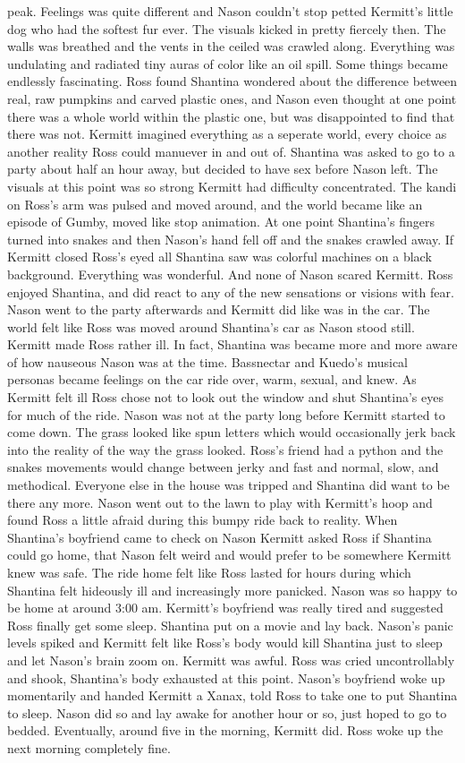 \documentclass[12pt]{book}
\begin{document}
peak. Feelings was quite different and Nason couldn't stop petted Kermitt's little dog who had the softest fur ever. The visuals kicked in pretty fiercely then. The walls was breathed and the vents in the ceiled was crawled along. Everything was undulating and radiated tiny auras of color like an oil spill. Some things became endlessly fascinating. Ross found Shantina wondered about the difference between real, raw pumpkins and carved plastic ones, and Nason even thought at one point there was a whole world within the plastic one, but was disappointed to find that there was not. Kermitt imagined everything as a seperate world, every choice as another reality Ross could manuever in and out of. Shantina was asked to go to a party about half an hour away, but decided to have sex before Nason left. The visuals at this point was so strong Kermitt had difficulty concentrated. The kandi on Ross's arm was pulsed and moved around, and the world became like an episode of Gumby, moved like stop animation. At one point Shantina's fingers turned into snakes and then Nason's hand fell off and the snakes crawled away. If Kermitt closed Ross's eyed all Shantina saw was colorful machines on a black background. Everything was wonderful. And none of Nason scared Kermitt. Ross enjoyed Shantina, and did react to any of the new sensations or visions with fear. Nason went to the party afterwards and Kermitt did like was in the car. The world felt like Ross was moved around Shantina's car as Nason stood still. Kermitt made Ross rather ill. In fact, Shantina was became more and more aware of how nauseous Nason was at the time. Bassnectar and Kuedo's musical personas became feelings on the car ride over, warm, sexual, and knew. As Kermitt felt ill Ross chose not to look out the window and shut Shantina's eyes for much of the ride. Nason was not at the party long before Kermitt started to come down. The grass looked like spun letters which would occasionally jerk back into the reality of the way the grass looked. Ross's friend had a python and the snakes movements would change between jerky and fast and normal, slow, and methodical. Everyone else in the house was tripped and Shantina did want to be there any more. Nason went out to the lawn to play with Kermitt's hoop and found Ross a little afraid during this bumpy ride back to reality. When Shantina's boyfriend came to check on Nason Kermitt asked Ross if Shantina could go home, that Nason felt weird and would prefer to be somewhere Kermitt knew was safe. The ride home felt like Ross lasted for hours during which Shantina felt hideously ill and increasingly more panicked. Nason was so happy to be home at around 3:00 am. Kermitt's boyfriend was really tired and suggested Ross finally get some sleep. Shantina put on a movie and lay back. Nason's panic levels spiked and Kermitt felt like Ross's body would kill Shantina just to sleep and let Nason's brain zoom on. Kermitt was awful. Ross was cried uncontrollably and shook, Shantina's body exhausted at this point. Nason's boyfriend woke up momentarily and handed Kermitt a Xanax, told Ross to take one to put Shantina to sleep. Nason did so and lay awake for another hour or so, just hoped to go to bedded. Eventually, around five in the morning, Kermitt did. Ross woke up the next morning completely fine. 
\end{document}
